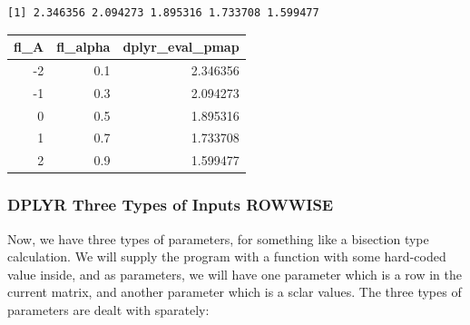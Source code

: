 \documentclass[
]{book}
\newenvironment{Shaded}{\begin{snugshade}}{\end{snugshade}}
\newcommand{\CommentTok}[1]{\textcolor[rgb]{0.56,0.35,0.01}{\textit{#1}}}
\newcommand{\DataTypeTok}[1]{\textcolor[rgb]{0.13,0.29,0.53}{#1}}
\newcommand{\KeywordTok}[1]{\textcolor[rgb]{0.13,0.29,0.53}{\textbf{#1}}}
\newcommand{\NormalTok}[1]{#1}
\newcommand{\OperatorTok}[1]{\textcolor[rgb]{0.81,0.36,0.00}{\textbf{#1}}}
\newcommand{\StringTok}[1]{\textcolor[rgb]{0.31,0.60,0.02}{#1}}
\begin{document}
\begin{verbatim}
[1] 2.346356 2.094273 1.895316 1.733708 1.599477
\end{verbatim}

\begin{Shaded}
\end{Shaded}

\begin{table}[!h]
\centering
\begin{tabular}{r|r|r}
\hline
fl\_A & fl\_alpha & dplyr\_eval\_pmap\\
\hline
\rowcolor{gray!6}  -2 & 0.1 & 2.346356\\
\hline
-1 & 0.3 & 2.094273\\
\hline
\rowcolor{gray!6}  0 & 0.5 & 1.895316\\
\hline
1 & 0.7 & 1.733708\\
\hline
\rowcolor{gray!6}  2 & 0.9 & 1.599477\\
\hline
\end{tabular}
\end{table}

\hypertarget{dplyr-three-types-of-inputs-rowwise}{%
\subsubsection{DPLYR Three Types of Inputs ROWWISE}\label{dplyr-three-types-of-inputs-rowwise}}

Now, we have three types of parameters, for something like a bisection type calculation. We will supply the program with a function with some hard-coded value inside, and as parameters, we will have one parameter which is a row in the current matrix, and another parameter which is a sclar values. The three types of parameters are dealt with sparately:
\end{document}
